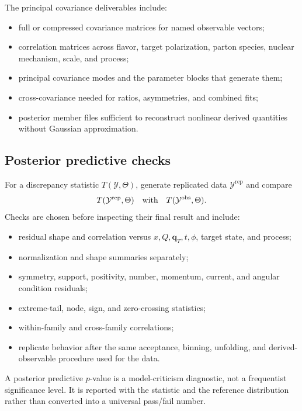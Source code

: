 \documentclass[11pt]{article}
\newcommand{\qT}{\bm{q}_{T}}
\newcommand{\cY}{\mathcal Y}
\newcommand{\obs}{\mathrm{obs}}
\newcommand{\repdata}{\mathrm{rep}}
\begin{document}
The principal covariance deliverables include:
\begin{itemize}
\item full or compressed covariance matrices for named observable vectors;
\item correlation matrices across flavor, target polarization, parton species,
nuclear mechanism, scale, and process;
\item principal covariance modes and the parameter blocks that generate them;
\item cross-covariance needed for ratios, asymmetries, and combined fits;
\item posterior member files sufficient to reconstruct nonlinear derived
quantities without Gaussian approximation.
\end{itemize}

\subsection{Posterior predictive checks}

For a discrepancy statistic \(T(\cY,\Theta)\), generate replicated data
\(\cY^{\repdata}\) and compare
\begin{equation}
 T(\cY^{\repdata},\Theta)
 \quad\hbox{with}\quad
 T(\cY^{\obs},\Theta).
 \label{eq:ppc}
\end{equation}
Checks are chosen before inspecting their final result and include:
\begin{itemize}
\item residual shape and correlation versus \(x,Q,\qT,t,\phi\), target state,
and process;
\item normalization and shape summaries separately;
\item symmetry, support, positivity, number, momentum, current, and angular
condition residuals;
\item extreme-tail, node, sign, and zero-crossing statistics;
\item within-family and cross-family correlations;
\item replicate behavior after the same acceptance, binning, unfolding, and
derived-observable procedure used for the data.
\end{itemize}

A posterior predictive \(p\)-value is a model-criticism diagnostic, not a
frequentist significance level.  It is reported with the statistic and the
reference distribution rather than converted into a universal pass/fail
number.
\end{document}
